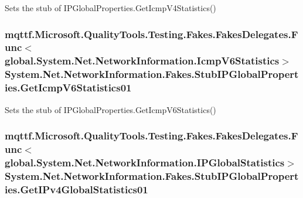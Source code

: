 Sets the stub of I\-P\-Global\-Properties.\-Get\-Icmp\-V4\-Statistics()

\hypertarget{class_system_1_1_net_1_1_network_information_1_1_fakes_1_1_stub_i_p_global_properties_a085e07a24d85c8903c63f32f1d1307bf}{
\subsubsection[{Get\-Icmp\-V6\-Statistics01}]{\setlength{\rightskip}{0pt plus 5cm}mqttf.\-Microsoft.\-Quality\-Tools.\-Testing.\-Fakes.\-Fakes\-Delegates.\-Func$<$global.\-System.\-Net.\-Network\-Information.\-Icmp\-V6\-Statistics$>$ System.\-Net.\-Network\-Information.\-Fakes.\-Stub\-I\-P\-Global\-Properties.\-Get\-Icmp\-V6\-Statistics01}}\label{class_system_1_1_net_1_1_network_information_1_1_fakes_1_1_stub_i_p_global_properties_a085e07a24d85c8903c63f32f1d1307bf}


Sets the stub of I\-P\-Global\-Properties.\-Get\-Icmp\-V6\-Statistics()

\hypertarget{class_system_1_1_net_1_1_network_information_1_1_fakes_1_1_stub_i_p_global_properties_a5ef6f787cb61cb5d3e92db2772de7e8a}{
\subsubsection[{Get\-I\-Pv4\-Global\-Statistics01}]{\setlength{\rightskip}{0pt plus 5cm}mqttf.\-Microsoft.\-Quality\-Tools.\-Testing.\-Fakes.\-Fakes\-Delegates.\-Func$<$global.\-System.\-Net.\-Network\-Information.\-I\-P\-Global\-Statistics$>$ System.\-Net.\-Network\-Information.\-Fakes.\-Stub\-I\-P\-Global\-Properties.\-Get\-I\-Pv4\-Global\-Statistics01}}\label{class_system_1_1_net_1_1_network_information_1_1_fakes_1_1_stub_i_p_global_properties_a5ef6f787cb61cb5d3e92db2772de7e8a}


